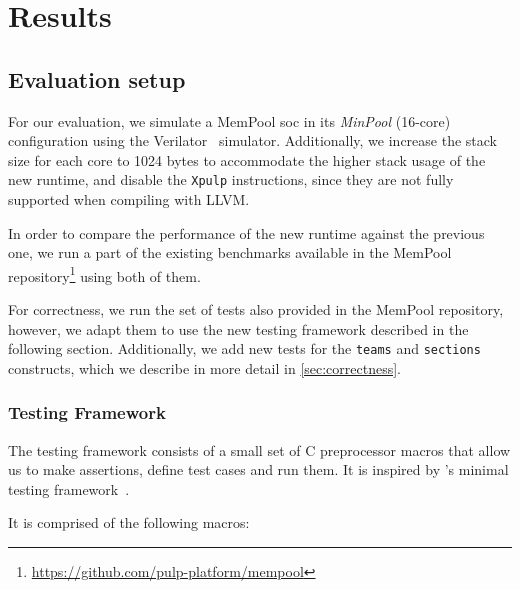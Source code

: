 \chapter{Results}
\label{ch:results}

\section{Evaluation setup}

For our evaluation, we simulate a MemPool \gls{soc} in its \emph{MinPool} (16-core) configuration
using the Verilator~\cite{verilator} simulator. Additionally, we increase the stack size for each
core to 1024 bytes to accommodate the higher stack usage of the new runtime, and disable the
\texttt{Xpulp} instructions, since they are not fully supported when compiling with LLVM.

In order to compare the performance of the new runtime against the previous one, we run a part of
the existing benchmarks available in the MemPool
repository\footnote{\url{https://github.com/pulp-platform/mempool}} using both of them.

For correctness, we run the set of tests also provided in the MemPool repository, however, we adapt
them to use the new testing framework described in the following section. Additionally, we add new
tests for the \texttt{teams} and \texttt{sections} constructs, which we describe in more detail in
\cref{sec:correctness}.

\subsection{Testing Framework}
\label{subsec:testing-framework}

The testing framework consists of a small set of C preprocessor macros that allow us to make
assertions, define test cases and run them. It is inspired by \citeauthor{minunit}'s minimal testing
framework~\cite{minunit}.

It is comprised of the following macros:

